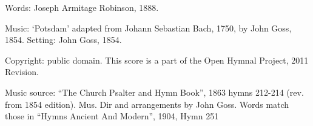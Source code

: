 \begin{multicols}{2}
\par\noindent
Words: Joseph Armitage Robinson, 1888.
\par\noindent
Music: `Potsdam' adapted from Johann Sebastian Bach, 1750, by John Goss, 1854. Setting: John Goss, 1854.
\par\noindent
Copyright: public domain. This score is a part of the Open Hymnal Project, 2011 Revision.
\par\noindent
Music source: ``The Church Psalter and Hymn Book'', 1863 hymns 212-214 (rev. from 1854 edition).  Mus. Dir and arrangements by John Goss. Words match those in ``Hymns Ancient And Modern'', 1904, Hymn 251

\end{multicols}

\normalsize